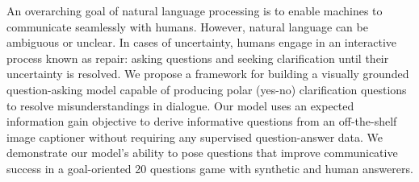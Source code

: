 An overarching goal of natural language processing is to enable machines to communicate seamlessly with humans. However, natural language can be ambiguous or unclear. In cases of uncertainty, humans engage in an interactive process known as repair: asking questions and seeking clarification until their uncertainty is resolved. We propose a framework for building a visually grounded question-asking model capable of producing polar (yes-no) clarification questions to resolve misunderstandings in dialogue. Our model uses an expected information gain objective to derive informative questions from an off-the-shelf image captioner without requiring any supervised question-answer data. We demonstrate our model's ability to pose questions that improve communicative success in a goal-oriented 20 questions game with synthetic and human answerers.
